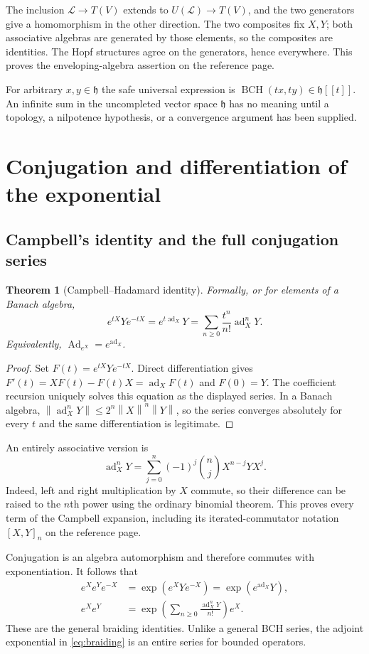 \documentclass[11pt]{article}
\numberwithin{equation}{section}
\newtheorem{theorem}{Theorem}[section]
\theoremstyle{definition}
\theoremstyle{remark}
\DeclareMathOperator{\ad}{ad}
\DeclareMathOperator{\Ad}{Ad}
\DeclareMathOperator{\BCH}{BCH}
\newcommand{\h}{\mathfrak{h}}
\newcommand{\cL}{\mathcal{L}}
\newcommand{\norm}[1]{\left\lVert#1\right\rVert}
\begin{document}
The inclusion $\cL\to T(V)$ extends to $U(\cL)\to T(V)$, and the
two generators give a homomorphism in the other direction. The two
composites fix $X,Y$; both associative algebras are generated by those
elements, so the composites are identities. The Hopf structures agree
on the generators, hence everywhere. This proves the enveloping-algebra
assertion on the reference page.

For arbitrary $x,y\in\h$ the safe universal expression is
$\BCH(tx,ty)\in\h[[t]]$. An infinite sum in the uncompleted vector
space $\h$ has no meaning until a topology, a nilpotence hypothesis,
or a convergence argument has been supplied.

\section{Conjugation and differentiation of the exponential}\label{sec:dexp}
\subsection{Campbell's identity and the full conjugation series}
\begin{theorem}[Campbell--Hadamard identity]\label{thm:hadamard}
Formally, or for elements of a Banach algebra,
\begin{equation}\label{eq:hadamard}
 e^{tX}Ye^{-tX}=e^{t\ad_X}Y
 =\sum_{n\geq0}\frac{t^n}{n!}\ad_X^nY.
\end{equation}
Equivalently, $\Ad_{e^X}=e^{\ad_X}$.
\end{theorem}
\begin{proof}
Set $F(t)=e^{tX}Ye^{-tX}$. Direct differentiation gives
$F'(t)=XF(t)-F(t)X=\ad_XF(t)$ and $F(0)=Y$.
The coefficient recursion uniquely solves this equation as the displayed
series. In a Banach algebra,
$\norm{\ad_X^nY}\leq2^n\norm X^n\norm Y$, so the series converges
absolutely for every $t$ and the same differentiation is legitimate.
\end{proof}
An entirely associative version is
\begin{equation}\label{eq:adbinomial}
 \ad_X^nY=\sum_{j=0}^n(-1)^j\binom nj X^{n-j}YX^j.
\end{equation}
Indeed, left and right multiplication by $X$ commute, so their difference
can be raised to the $n$th power using the ordinary binomial theorem.
This proves every term of the Campbell expansion, including its
iterated-commutator notation $[X,Y]_n$ on the reference page.

Conjugation is an algebra automorphism and therefore commutes with
exponentiation. It follows that
\begin{align}
 e^Xe^Ye^{-X}&=\exp(e^XYe^{-X})
              =\exp(e^{\ad_X}Y),\label{eq:conjexp}\\
 e^Xe^Y&=\exp\left(\sum_{n\geq0}\frac{\ad_X^nY}{n!}\right)e^X.
 \label{eq:braiding}
\end{align}
These are the general braiding identities. Unlike a general BCH series,
the adjoint exponential in \eqref{eq:braiding} is an entire series for
bounded operators.
\end{document}
